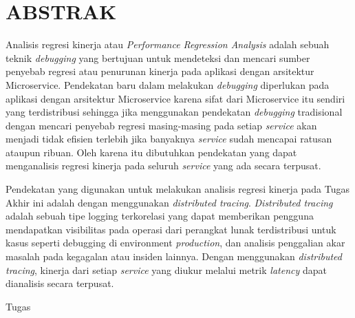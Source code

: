 \clearpage
\chapter*{ABSTRAK}

Analisis regresi kinerja atau \textit{Performance Regression Analysis} adalah sebuah teknik \textit{debugging} yang bertujuan untuk mendeteksi dan mencari sumber penyebab regresi atau penurunan kinerja pada aplikasi dengan arsitektur Microservice. Pendekatan baru dalam melakukan \textit{debugging} diperlukan pada aplikasi dengan arsitektur Microservice karena sifat dari Microservice itu sendiri yang terdistribusi sehingga jika menggunakan pendekatan \textit{debugging} tradisional dengan mencari penyebab regresi masing-masing pada setiap \textit{service} akan menjadi tidak efisien terlebih jika banyaknya \textit{service} sudah mencapai ratusan ataupun ribuan. Oleh karena itu dibutuhkan pendekatan yang dapat menganalisis regresi kinerja pada seluruh \textit{service} yang ada secara terpusat. 

Pendekatan yang digunakan untuk melakukan analisis regresi kinerja pada Tugas Akhir ini adalah dengan menggunakan \textit{distributed tracing}. \textit{Distributed tracing} adalah sebuah tipe logging terkorelasi yang dapat memberikan pengguna mendapatkan visibilitas pada operasi dari perangkat lunak terdistribusi untuk kasus seperti debugging di environment \textit{production}, dan analisis penggalian akar masalah pada kegagalan atau insiden lainnya. Dengan menggunakan \textit{distributed tracing}, kinerja dari setiap \textit{service} yang diukur melalui metrik \textit{latency} dapat dianalisis secara terpusat.

Tugas 

